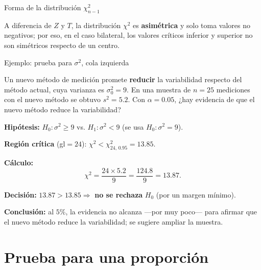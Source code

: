 \documentclass[aspectratio=169,11pt]{beamer}
\begin{document}
\begin{frame}{Forma de la distribución $\chi^2_{n-1}$}
\centering
{}
\vspace{0.2cm}

A diferencia de $Z$ y $T$, la distribución $\chi^2$ es \textbf{asimétrica} y solo toma valores no negativos; por eso, en el caso bilateral, los valores críticos inferior y superior no son simétricos respecto de un centro.
\end{frame}

\begin{frame}{Ejemplo: prueba para $\sigma^2$, cola izquierda}
\begin{example}
Un nuevo método de medición promete \textbf{reducir} la variabilidad respecto del método actual, cuya varianza es $\sigma_0^2=9$. En una muestra de $n=25$ mediciones con el nuevo método se obtuvo $s^2=5.2$. Con $\alpha=0.05$, ¿hay evidencia de que el nuevo método reduce la variabilidad?

\textbf{Hipótesis:} $H_0:\sigma^2\ge9$ vs. $H_1:\sigma^2<9$ (se usa $H_0:\sigma^2=9$).

\textbf{Región crítica} (gl$=24$): $\chi^2<\chi^2_{24,\,0.95}=13.85$.

\textbf{Cálculo:}
\[
\chi^2=\frac{24\times5.2}{9}=\frac{124.8}{9}=13.87.
\]

\textbf{Decisión:} $13.87>13.85\Rightarrow$ \textbf{no se rechaza} $H_0$ (por un margen mínimo).

\textbf{Conclusión:} al $5\%$, la evidencia no alcanza —por muy poco— para afirmar que el nuevo método reduce la variabilidad; se sugiere ampliar la muestra.
\end{example}
\end{frame}

\section{Prueba para una proporción}
\end{document}
